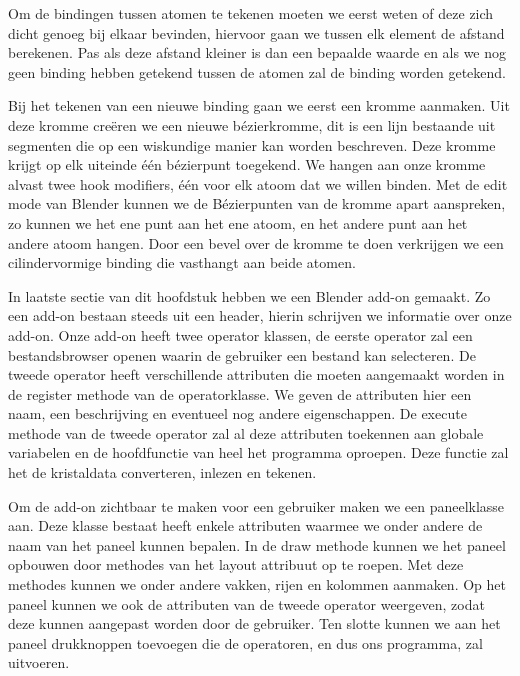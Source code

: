 \par   
Om de bindingen tussen atomen te tekenen moeten we eerst weten of deze zich dicht genoeg bij elkaar bevinden, hiervoor gaan we tussen elk element de afstand berekenen. Pas als deze afstand kleiner is dan een bepaalde waarde en als we nog geen binding hebben getekend tussen de atomen zal de binding worden getekend.
\par
Bij het tekenen van een nieuwe binding gaan we eerst een kromme aanmaken. Uit deze kromme creëren we een nieuwe bézierkromme, dit is een lijn bestaande uit segmenten die op een wiskundige manier kan worden beschreven. Deze kromme krijgt op elk uiteinde één bézierpunt toegekend. We hangen aan onze kromme alvast twee hook modifiers, één voor elk atoom dat we willen binden. Met de edit mode van Blender kunnen we de Bézierpunten van de kromme apart aanspreken, zo kunnen we het ene punt aan het ene atoom, en het andere punt aan het andere atoom hangen. Door een bevel over de kromme te doen verkrijgen we een cilindervormige binding die vasthangt aan beide atomen.
\par
In laatste sectie van dit hoofdstuk hebben we een Blender add-on gemaakt. Zo een add-on bestaan steeds uit een header, hierin schrijven we informatie over onze add-on. Onze add-on heeft twee operator klassen, de eerste operator zal een bestandsbrowser openen waarin de gebruiker een bestand kan selecteren. De tweede operator heeft verschillende attributen die moeten aangemaakt worden in de register methode van de operatorklasse. We geven de attributen hier een naam, een beschrijving en eventueel nog andere eigenschappen. De execute methode van de tweede operator zal al deze attributen toekennen aan globale variabelen en de hoofdfunctie van heel het programma oproepen. Deze functie zal het de kristaldata converteren, inlezen en tekenen.
\par 
Om de add-on zichtbaar te maken voor een gebruiker maken we een paneelklasse aan. Deze klasse bestaat heeft enkele attributen waarmee we onder andere de naam van het paneel kunnen bepalen. In de draw methode kunnen we het paneel opbouwen door methodes van het layout attribuut op te roepen. Met deze methodes kunnen we onder andere vakken, rijen en kolommen aanmaken. Op het paneel kunnen we ook de attributen van de tweede operator weergeven, zodat deze kunnen aangepast worden door de gebruiker. Ten slotte kunnen we aan het paneel drukknoppen toevoegen die de operatoren, en dus ons programma, zal uitvoeren. 



